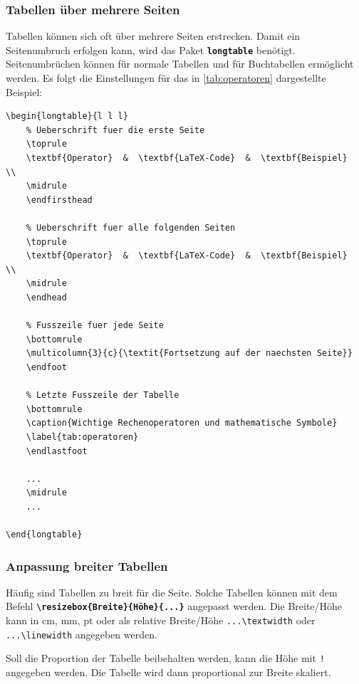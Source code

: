 \subsubsection{Tabellen über mehrere Seiten}
Tabellen können sich oft über mehrere Seiten erstrecken. Damit ein Seitenumbruch erfolgen kann, wird das Paket \textbf{\texttt{longtable}} benötigt. Seitenumbrüchen können für normale Tabellen und für Buchtabellen ermöglicht werden. Es folgt die Einstellungen für das in \autoref{tab:operatoren} dargestellte Beispiel:

\begin{lstlisting}[language={[LaTeX]TeX}, emph={\endfirsthead,\endhead,\endfoot,\endlastfoot}, emphstyle={\color{red}}]
\begin{longtable}{l l l}
    % Ueberschrift fuer die erste Seite
    \toprule
    \textbf{Operator}  &  \textbf{LaTeX-Code}  &  \textbf{Beispiel}  \\
    \midrule
    \endfirsthead

    % Ueberschrift fuer alle folgenden Seiten
    \toprule
    \textbf{Operator}  &  \textbf{LaTeX-Code}  &  \textbf{Beispiel}  \\
    \midrule
    \endhead

    % Fusszeile fuer jede Seite
    \bottomrule
    \multicolumn{3}{c}{\textit{Fortsetzung auf der naechsten Seite}}
    \endfoot

    % Letzte Fusszeile der Tabelle
    \bottomrule
    \caption{Wichtige Rechenoperatoren und mathematische Symbole}
    \label{tab:operatoren}
    \endlastfoot

    ... 
    \midrule
    ... 

\end{longtable}
\end{lstlisting}

\subsubsection{Anpassung breiter Tabellen}
Häufig sind Tabellen zu breit für die Seite. Solche Tabellen können mit dem Befehl \textbf{\texttt{\textbackslash resizebox\{Breite\}\{Höhe\}\{...\}}} angepasst werden. Die Breite/Höhe kann in cm, mm, pt oder als relative Breite/Höhe \texttt{...\textbackslash textwidth} oder \texttt{...\textbackslash linewidth} angegeben werden.

Soll die Proportion der Tabelle beibehalten werden, kann die Höhe mit \texttt{!} angegeben werden. Die Tabelle wird dann proportional zur Breite skaliert.

